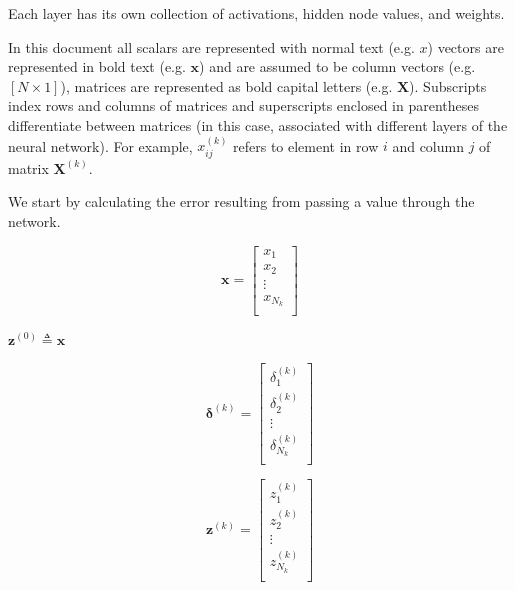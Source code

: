 \documentclass{article}
\begin{document}
Each layer has its own collection of activations, hidden node values, and weights.

In this document all scalars are represented with normal text (e.g. $x$) vectors are represented in bold text (e.g. $\mathbf{x}$) and are assumed to be column vectors (e.g. $[N \times 1]$), matrices are represented as bold capital letters (e.g. $\mathbf{X}$). Subscripts index rows and columns of matrices and superscripts enclosed in parentheses differentiate between matrices (in this case, associated with different layers of the neural network). For example, $x_{ij}^{(k)}$ refers to element in row $i$ and column $j$ of matrix $\mathbf{X}^{(k)}$.

We start by calculating the error resulting from passing a value through the network.







\begin{equation}
\mathbf{x} = 
    \begin{bmatrix}
        x_{1}\\
        x_{2}\\
        \vdots\\
        x_{N_{k}}\\
    \end{bmatrix}
\end{equation}

$\mathbf{z}^{(0)} \triangleq \mathbf{x}$

\begin{equation}
\bm{\delta}^{(k)} = 
    \begin{bmatrix}
        \delta_1^{(k)}\\
        \delta_2^{(k)}\\
        \vdots\\
        \delta_{N_k}^{(k)}\\
    \end{bmatrix}
\end{equation}

\begin{equation}
\mathbf{z}^{(k)} = 
    \begin{bmatrix}
        z_1^{(k)}\\
        z_2^{(k)}\\
        \vdots\\
        z_{N_k}^{(k)}\\
    \end{bmatrix}
\end{equation}
\end{document}
